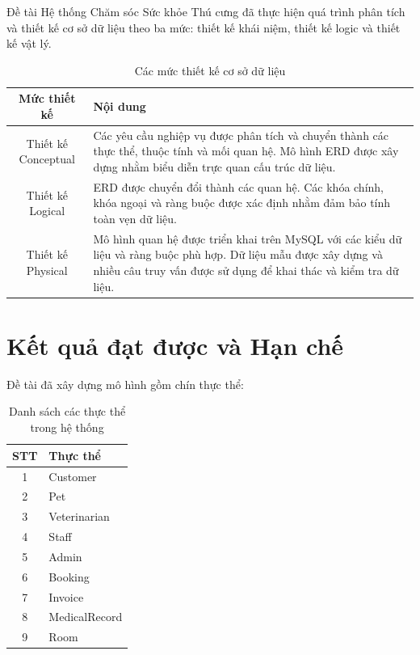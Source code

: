 Đề tài Hệ thống Chăm sóc Sức khỏe Thú cưng đã thực hiện quá trình phân tích và thiết kế cơ sở dữ liệu theo ba mức: thiết kế khái niệm, thiết kế logic và thiết kế vật lý.

\begin{table}[htbp]
    \centering
    \caption{Các mức thiết kế cơ sở dữ liệu}
    \label{tab:design_levels}
    \begin{tabular}{|c|p{10cm}|}
        \hline
        \textbf{Mức thiết kế} & \textbf{Nội dung} \\ \hline

        Thiết kế Conceptual &
        Các yêu cầu nghiệp vụ được phân tích và chuyển thành các thực thể,
        thuộc tính và mối quan hệ. Mô hình ERD được xây dựng nhằm biểu diễn
        trực quan cấu trúc dữ liệu.
        \\ \hline

        Thiết kế Logical &
        ERD được chuyển đổi thành các quan hệ. Các khóa chính, khóa ngoại
        và ràng buộc được xác định nhằm đảm bảo tính toàn vẹn dữ liệu.
        \\ \hline

        Thiết kế Physical &
        Mô hình quan hệ được triển khai trên MySQL với các kiểu dữ liệu và
        ràng buộc phù hợp. Dữ liệu mẫu được xây dựng và nhiều câu truy vấn
        được sử dụng để khai thác và kiểm tra dữ liệu.
        \\ \hline

    \end{tabular}
\end{table}

\section{Kết quả đạt được và Hạn chế}

Đề tài đã xây dựng mô hình gồm chín thực thể:

\begin{table}[htbp]
    \centering
    \caption{Danh sách các thực thể trong hệ thống}
    \label{tab:entity_list}
    \begin{tabular}{|c|l|}
        \hline
        \textbf{STT} & \textbf{Thực thể} \\ \hline
        1 & Customer \\ \hline
        2 & Pet \\ \hline
        3 & Veterinarian \\ \hline
        4 & Staff \\ \hline
        5 & Admin \\ \hline
        6 & Booking \\ \hline
        7 & Invoice \\ \hline
        8 & MedicalRecord \\ \hline
        9 & Room \\ \hline
    \end{tabular}
\end{table}

